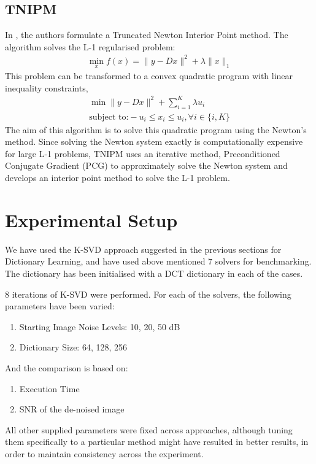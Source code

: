 \documentclass{article} %
\begin{document}
\subsection{TNIPM}
In \cite{l1lskim2007efficient}, the authors formulate a Truncated Newton Interior Point method. The algorithm solves the L-1 regularised problem:
\begin{align}
\min_x f(x) = \|y - Dx\|^2 + \lambda\|x\|_1
\end{align}
This problem can be transformed to a convex quadratic program with linear inequality constraints,
\begin{align}
\min \|y - Dx\|^2 + \sum_{i= 1}^{K}\lambda u_i	\\
\text{subject to:} -u_i \leq x_i \leq u_i, \forall i \in \{i,K\}
\end{align}
The aim of this algorithm is to solve this quadratic program using the Newton's method. Since solving the Newton system exactly is computationally expensive for large L-1 problems, TNIPM uses an iterative method, Preconditioned Conjugate Gradient (PCG) to approximately solve the Newton system and develops an interior point method to solve the L-1 problem. 

\vspace{.2cm}
\section{Experimental Setup}
\vspace{.2cm}
We have used the K-SVD approach suggested in the previous sections for Dictionary Learning, and have used above mentioned 7 solvers for benchmarking.
The dictionary has been initialised with a DCT dictionary in each of the cases.

8 iterations of K-SVD were performed.
For each of the solvers, the following parameters have been varied:
\begin{enumerate}
\item Starting Image Noise Levels: 10, 20, 50 dB
\item Dictionary Size: 64, 128, 256
\end{enumerate}

And the comparison is based on:
\begin{enumerate}
\item Execution Time
\item SNR of the de-noised image
\end{enumerate}

All other supplied parameters were fixed across approaches, although tuning them specifically to a particular method might have resulted in better results, in order to maintain consistency across the experiment.
\end{document}
